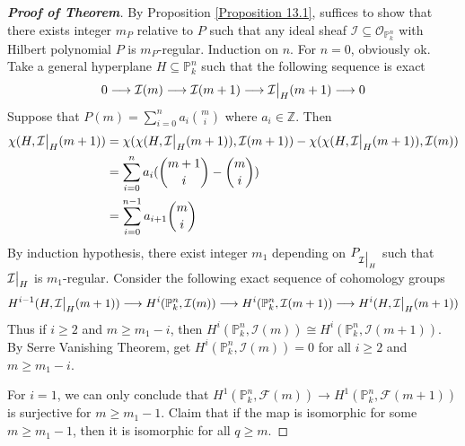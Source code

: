 \documentclass{ctexart}
\begin{document}
\begin{proof}[\textbf{\emph{Proof of Theorem}}]
    By Proposition \ref{Proposition 13.1}, suffices to show that there exists integer $m_{P}$ relative to $P$ such that any ideal sheaf $\mathcal{I} \subseteq \mathcal{O}_{\mathbb{P}_{k}^{n}}$ with Hilbert polynomial $P$ is $m_{P}$-regular.
    Induction on $n$.
    For $n = 0$, obviously ok.
    Take a general hyperplane $H \subseteq \mathbb{P}_{k}^{n}$ such that the following sequence is exact
    \begin{equation*}
        0 \longrightarrow \mathcal{I}(m) \longrightarrow \mathcal{I}(m + 1) \longrightarrow \mathcal{I}\big{|}_{H}(m + 1) \longrightarrow 0
    \end{equation*}
    Suppose that $P(m) = \sum_{i = 0}^{n} a_{i}\binom{m}{i}$ where $a_{i}\in \mathbb{Z}$.
    Then
    \begin{equation*}
        \begin{split}
            \chi(H, \mathcal{I}\big{|}_{H}(m + 1)) & = \chi(\chi(H, \mathcal{I}\big{|}_{H}(m + 1)) , \mathcal{I}(m + 1)) - \chi(\chi(H, \mathcal{I}\big{|}_{H}(m + 1)) , \mathcal{I}(m)) \\
            & = \sum_{i = 0}^{n} a_{i}(\binom{m + 1}{i} - \binom{m}{i}) \\
            & = \sum_{i = 0}^{n - 1} a_{i + 1}\binom{m}{i}
        \end{split}
    \end{equation*}
    By induction hypothesis, there exist integer $m_{1}$ depending on $P_{\mathcal{I}\big{|}_{H}}$ such that $\mathcal{I}\big{|}_{H}$ is $m_{1}$-regular.
    Consider the following exact sequence of cohomology groups
    \begin{equation*}
        H^{i - 1}(H, \mathcal{I}\big{|}_{H}(m + 1)) \longrightarrow H^{i}(\mathbb{P}_{k}^{n}, \mathcal{I}(m)) \longrightarrow H^{i}(\mathbb{P}_{k}^{n}, \mathcal{I}(m + 1)) \longrightarrow H^{i}(H, \mathcal{I}\big{|}_{H}(m + 1))
    \end{equation*}
    Thus if $i \ge 2$ and $m \ge m_{1} - i$, then $H^{i}(\mathbb{P}_{k}^{n}, \mathcal{I}(m)) \cong H^{i}(\mathbb{P}_{k}^{n}, \mathcal{I}(m + 1))$.
    By Serre Vanishing Theorem, get $H^{i}(\mathbb{P}_{k}^{n}, \mathcal{I}(m)) = 0$ for all $i \ge 2$ and $m \ge m_{1} - i$.
    \par
    For $i = 1$, we can only conclude that $H^{1}(\mathbb{P}_{k}^{n}, \mathcal{F}(m)) \longrightarrow H^{1}(\mathbb{P}_{k}^{n}, \mathcal{F}(m + 1))$ is surjective for $m \ge m_{1} - 1$.
    Claim that if the map is isomorphic for some $m \ge m_{1} - 1$, then it is isomorphic for all $q \ge m$.

\end{proof}
\end{document}
